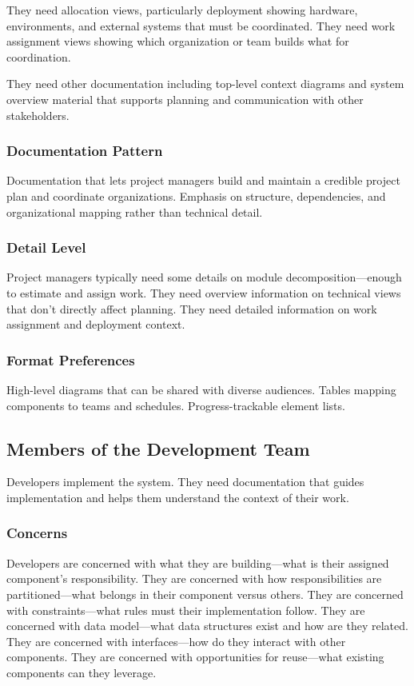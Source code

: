 \documentclass[11pt]{article}
\begin{document}
They need allocation views, particularly deployment showing hardware, environments, and external systems that must be coordinated. They need work assignment views showing which organization or team builds what for coordination.

They need other documentation including top-level context diagrams and system overview material that supports planning and communication with other stakeholders.

\subsubsection{Documentation Pattern}

Documentation that lets project managers build and maintain a credible project plan and coordinate organizations. Emphasis on structure, dependencies, and organizational mapping rather than technical detail.

\subsubsection{Detail Level}

Project managers typically need some details on module decomposition---enough to estimate and assign work. They need overview information on technical views that don't directly affect planning. They need detailed information on work assignment and deployment context.

\subsubsection{Format Preferences}

High-level diagrams that can be shared with diverse audiences. Tables mapping components to teams and schedules. Progress-trackable element lists.

\subsection{Members of the Development Team}

Developers implement the system. They need documentation that guides implementation and helps them understand the context of their work.

\subsubsection{Concerns}

Developers are concerned with what they are building---what is their assigned component's responsibility. They are concerned with how responsibilities are partitioned---what belongs in their component versus others. They are concerned with constraints---what rules must their implementation follow. They are concerned with data model---what data structures exist and how are they related. They are concerned with interfaces---how do they interact with other components. They are concerned with opportunities for reuse---what existing components can they leverage.
\end{document}
